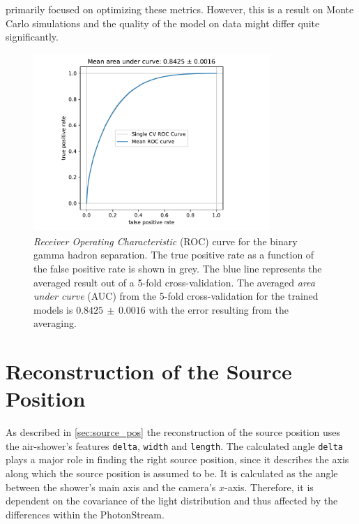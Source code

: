 primarily focused on optimizing these metrics. However, this is a result on
Monte Carlo simulations and the quality of the model on data might differ quite
significantly.
%
\begin{figure}
  \centering
  \includegraphics[width=0.8\textwidth, page=1]{Plots/results/DBSCAN/separation_performance.pdf}
  \caption{\textit{Receiver Operating Characteristic} (ROC) curve for the binary gamma hadron separation. The true positive rate as a function of the false positive rate is shown in grey. The blue line represents the averaged result out of a 5-fold cross-validation. The averaged \textit{area under curve} (AUC) from the 5-fold cross-validation for the trained models is $0.8425\,\pm\,0.0016$ with the error resulting from the averaging.}
  \label{fig:sep_auc}
\end{figure}
%
%
%

\section{Reconstruction of the Source Position}
%
As described in \autoref{sec:source_pos} the reconstruction of the source
position uses the air-shower's features \texttt{delta}, \texttt{width} and
\texttt{length}. The calculated angle \texttt{delta} plays a major role in
finding the right source position, since it describes the axis along which
the source position is assumed to be. It is calculated as the angle between
the shower's main axis and the camera's $x$-axis. Therefore, it is dependent
on the covariance of the light distribution and thus affected by the
differences within the PhotonStream.

